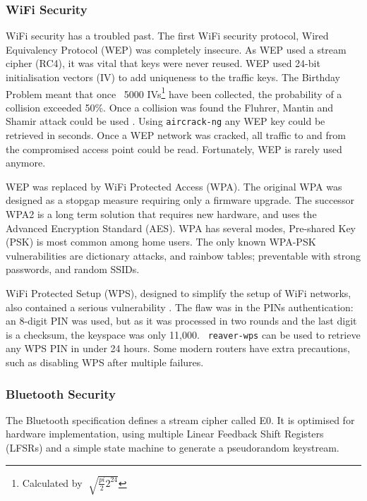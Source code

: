 \documentclass[10pt,journal,compsoc]{IEEEtran}
\begin{document}
\subsubsection{WiFi Security}
WiFi security has a troubled past. The first WiFi security protocol, Wired
Equivalency Protocol (WEP) was completely insecure. As WEP used a stream cipher
(RC4), it was vital that keys were never reused. WEP used 24-bit initialisation
vectors (IV) to add uniqueness to the traffic keys. The Birthday Problem meant
that once ~5000 IVs\footnote{Calculated by $\sqrt[]{\frac{pi}{2} 2^{24}} $}
have been collected, the probability of a collision exceeded 50\%. Once a
collision was found the Fluhrer, Mantin and Shamir attack could be used
\cite{Fluhrer2001}. Using {\tt aircrack-ng} any WEP key could be retrieved in
seconds. Once a WEP network was cracked, all traffic to and from the
compromised access point could be read. Fortunately, WEP is rarely used
anymore.

WEP was replaced by WiFi Protected Access (WPA). The original WPA was designed
as a stopgap measure requiring only a firmware upgrade. The successor WPA2 is a
long term solution that requires new hardware, and uses the Advanced Encryption
Standard (AES). WPA has several modes, Pre-shared Key (PSK) is most common
among home users. The only known WPA-PSK vulnerabilities are dictionary
attacks, and rainbow tables; preventable with strong passwords, and random
SSIDs. 

WiFi Protected Setup (WPS), designed to simplify the setup of WiFi networks,
also contained a serious vulnerability \cite{Viehbock2011}. The flaw was in the
PINs authentication: an 8-digit PIN was used, but as it was processed in two
rounds and the last digit is a checksum, the keyspace was only 11,000. {\tt
reaver-wps} can be used to retrieve any WPS PIN in under 24 hours. Some modern
routers have extra precautions, such as disabling WPS after multiple failures. 

\subsubsection{Bluetooth Security}
The Bluetooth specification \cite{BTSpec} defines a stream cipher called E0.
It is optimised for  hardware implementation, using multiple Linear Feedback
Shift Registers (LFSRs) and a simple state machine to generate a pseudorandom
keystream. 
\end{document}
